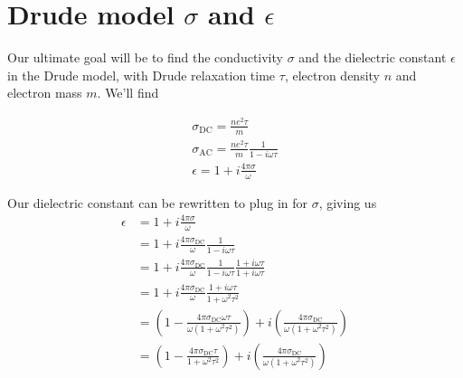 \documentclass[../../main.tex]{subfiles}
\newcommand{\sigmaDC}{\sigma_{\textrm{DC}}}
\newcommand{\sigmaAC}{\sigma_{\textrm{AC}}}
\begin{document}
\section{Drude model $\sigma$ and $\epsilon$}

Our ultimate goal will be to find the conductivity $\sigma$ and the dielectric constant $\epsilon$ in the Drude model, with Drude relaxation time $\tau$, electron density $n$ and electron mass $m$. We'll find

\begin{gather}
	\sigmaDC = \frac{n e^2 \tau}{m} \\
	\sigmaAC = \frac{n e^2 \tau}{m} \frac{1}{1 - i \omega \tau} \\
	\epsilon = 1 + i \frac{4 \pi \sigma}{\omega}
\end{gather}

Our dielectric constant can be rewritten to plug in for $\sigma$, giving us
\begin{align}
	\epsilon &= 1 + i \frac{4 \pi \sigma}{\omega} \\
	&= 1 + i \frac{4 \pi \sigmaDC}{\omega} \frac{1}{1 - i \omega \tau} \\
 &= 1 + i \frac{4 \pi \sigmaDC}{\omega} \frac{1}{1 - i \omega \tau} \frac{1 + i \omega\tau}{1 + i \omega \tau} \\
 &= 1 + i \frac{4 \pi \sigmaDC}{\omega} \frac{1 + i \omega \tau}{1 + \omega^2 \tau^2} \\
 &= \left(1 - \frac{4 \pi \sigmaDC \omega \tau}{\omega\left(1 + \omega^2 \tau^2 \right)} \right) + i \left( \frac{4 \pi \sigmaDC}{\omega \left( 1 + \omega^2 \tau^2 \right)} \right) \\
 &= \left(1 - \frac{4 \pi \sigmaDC  \tau}{1 + \omega^2 \tau^2 } \right) + i \left( \frac{4 \pi \sigmaDC}{\omega \left( 1 + \omega^2 \tau^2 \right)} \right) 
\end{align}
\end{document}
